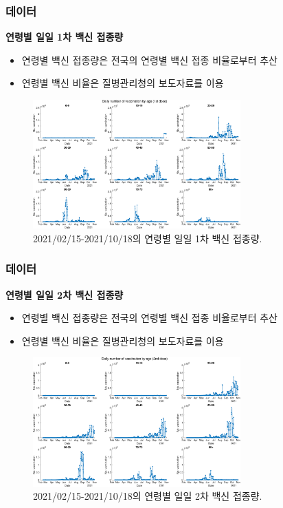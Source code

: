 \documentclass[aspectratio=169, 9pt, xcolor=dvipsnames]{beamer}
\begin{document}
	\begin{frame}\frametitle{데이터}
	    \textbf{연령별 일일 1차 백신 접종량}
	    \begin{itemize}
	    	\item 연령별 백신 접종량은 전국의 연령별 백신 접종 비율로부터 추산
	    	\item 연령별 백신 비율은 질병관리청의 보도자료를 이용
	    \end{itemize}
	    \begin{figure}
	    	\centering
	    	\includegraphics[width=8cm]{../results/data/vaccine_number_by_age_1st.eps}
	    	\caption{2021/02/15-2021/10/18의 연령별 일일 1차 백신 접종량.}
	    \end{figure}
	\end{frame}

	\begin{frame}\frametitle{데이터}
	    \textbf{연령별 일일 2차 백신 접종량}
	    \begin{itemize}
	    	\item 연령별 백신 접종량은 전국의 연령별 백신 접종 비율로부터 추산
	    	\item 연령별 백신 비율은 질병관리청의 보도자료를 이용
	    \end{itemize}
	    \begin{figure}
	    	\centering
	    	\includegraphics[width=8cm]{../results/data/vaccine_number_by_age_2nd.eps}
	    	\caption{2021/02/15-2021/10/18의 연령별 일일 2차 백신 접종량.}
	    \end{figure}
	\end{frame}
\end{document}
